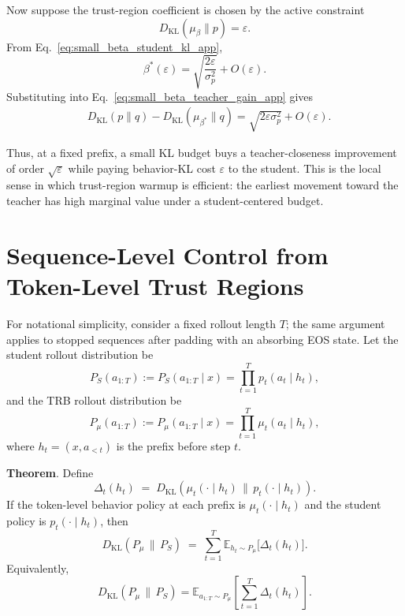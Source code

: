 \documentclass[11pt]{article}
\renewcommand{\paragraph}[1]{\vspace{1mm}\noindent\textbf{#1}.}
\begin{document}
Now suppose the trust-region coefficient is chosen by the active constraint
\[
D_{\mathrm{KL}}(\mu_\beta\|p)=\varepsilon.
\]
From Eq.~\ref{eq:small_beta_student_kl_app},
\begin{equation}
\beta^*(\varepsilon)
=
\sqrt{\frac{2\varepsilon}{\sigma_p^2}}
+
O(\varepsilon).
\label{eq:small_eps_beta_star_app}
\end{equation}
Substituting into Eq.~\ref{eq:small_beta_teacher_gain_app} gives
\begin{equation}
\begin{aligned}
&D_{\mathrm{KL}}(p\|q)
-
D_{\mathrm{KL}}(\mu_{\beta^*}\|q)
 =
\sqrt{2\varepsilon\sigma_p^2}
+
O(\varepsilon).
\end{aligned}
\label{eq:small_eps_teacher_gain_app}
\end{equation}

Thus, at a fixed prefix, a small KL budget buys a teacher-closeness improvement of order $\sqrt{\varepsilon}$ while paying behavior-KL cost $\varepsilon$ to the student.
This is the local sense in which trust-region warmup is efficient: the earliest movement toward the teacher has high marginal value under a student-centered budget.

\section{Sequence-Level Control from Token-Level Trust Regions}
\label{app:sequence_kl}

For notational simplicity, consider a fixed rollout length $T$; the same argument applies to stopped sequences after padding with an absorbing EOS state.
Let the student rollout distribution be
\begin{equation*}
P_S(a_{1:T})
:=
P_S(a_{1:T}\mid x)
=
\prod_{t=1}^T p_t(a_t\mid h_t),
\end{equation*}
and the TRB rollout distribution be
\begin{equation*}
P_{\mu}(a_{1:T})
:=
P_{\mu}(a_{1:T}\mid x)
=
\prod_{t=1}^T \mu_t(a_t\mid h_t),
\end{equation*}
where $h_t=(x,a_{<t})$ is the prefix before step $t$.

\paragraph{Theorem}
Define
\[
\Delta_t(h_t)
\;=\;
D_{\mathrm{KL}}(\mu_t(\cdot\mid h_t)\,\|\,p_t(\cdot\mid h_t)).
\]
If the token-level behavior policy at each prefix is $\mu_t(\cdot\mid h_t)$ and the student policy is $p_t(\cdot\mid h_t)$, then
\begin{equation}
\label{eq:rollout-kl-decomposition}
D_{\mathrm{KL}}(P_{\mu}\,\|\,P_S)
\;=\;
\sum_{t=1}^T
\mathbb{E}_{h_t\sim P_{\mu}}
\bigl[\Delta_t(h_t)\bigr].
\end{equation}
Equivalently,
\[
D_{\mathrm{KL}}(P_{\mu}\,\|\,P_S)
=
\mathbb{E}_{a_{1:T}\sim P_{\mu}}
\left[
\sum_{t=1}^T \Delta_t(h_t)
\right].
\]
\end{document}
